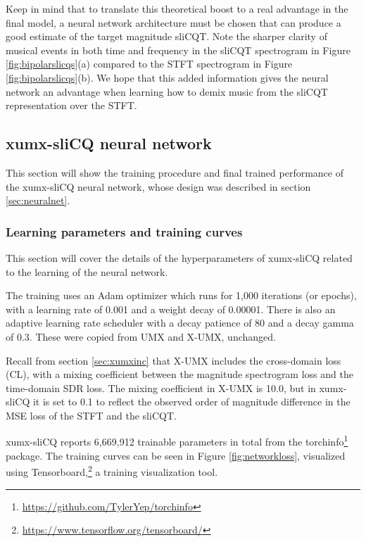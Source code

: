 \documentclass[report.tex]{subfiles}
\begin{document}
Keep in mind that to translate this theoretical boost to a real advantage in the final model, a neural network architecture must be chosen that can produce a good estimate of the target magnitude sliCQT. Note the sharper clarity of musical events in both time and frequency in the sliCQT spectrogram in Figure \ref{fig:bipolarslicqs}(a) compared to the STFT spectrogram in Figure \ref{fig:bipolarslicqs}(b). We hope that this added information gives the neural network an advantage when learning how to demix music from the sliCQT representation over the STFT.

\newpagefill

\subsection{xumx-sliCQ neural network}

This section will show the training procedure and final trained performance of the xumx-sliCQ neural network, whose design was described in section \ref{sec:neuralnet}.

\subsubsection{Learning parameters and training curves}

This section will cover the details of the hyperparameters of xumx-sliCQ related to the learning of the neural network.

The training uses an Adam optimizer which runs for 1,000 iterations (or epochs), with a learning rate of 0.001 and a weight decay of 0.00001. There is also an adaptive learning rate scheduler with a decay patience of 80 and a decay gamma of 0.3. These were copied from UMX and X-UMX, unchanged.

Recall from section \ref{sec:xumxinc} that X-UMX includes the cross-domain loss (CL), with a mixing coefficient between the magnitude spectrogram loss and the time-domain SDR loss. The mixing coefficient in X-UMX is 10.0, but in xumx-sliCQ it is set to 0.1 to reflect the observed order of magnitude difference in the MSE loss of the STFT and the sliCQT.

xumx-sliCQ reports 6,669,912 trainable parameters in total from the torchinfo\footnote{\url{https://github.com/TylerYep/torchinfo}} package. The training curves can be seen in Figure \ref{fig:networkloss}, visualized using Tensorboard,\footnote{\url{https://www.tensorflow.org/tensorboard/}} a training visualization tool.
\end{document}
